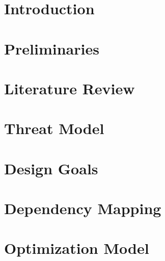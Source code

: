 \documentclass[conference]{IEEEtran}
\begin{document}
	
\maketitle
\begingroup\renewcommand\thefootnote{\textsection}



\maketitle

\begin{abstract}

\end{abstract}

\section{Introduction}\label{Introduction}


\section{Preliminaries}\label{prelim}


\section{Literature Review}\label{literature_review}


\section{Threat Model}\label{Threat Model}


\section{Design Goals}\label{Design Goals}


\section{Dependency Mapping}\label{Novel Mapping}


\section{Optimization Model}\label{Proposed Scheme}

\end{document}
